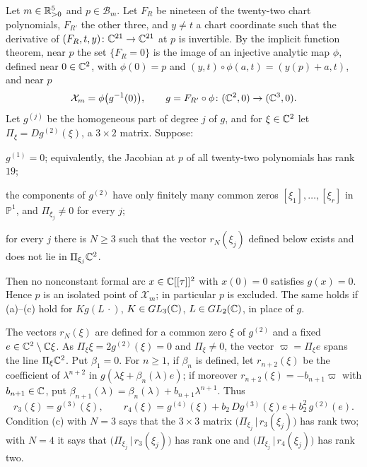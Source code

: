 \begin{lemma}\label{lem:d2-corank-two}
Let $m\in\mathbb{R}_{>0}^5$ and $p\in\mathcal B_m$.  Let $F_R$ be nineteen of the twenty-two chart polynomials,
$F_{R'}$ the other three, and $y\ne t$ a chart coordinate such that the derivative of
$(F_R,t,y)\colon\mathbb{C}^{21}\to\mathbb{C}^{21}$ at $p$ is invertible.  By the implicit function theorem,
near $p$ the set $\{F_R=0\}$ is the image of an injective analytic map $\phi$, defined near
$0\in\mathbb{C}^2$, with $\phi(0)=p$ and $(y,t)\circ\phi(a,t)=(y(p)+a,t)$, and near $p$
\[
  \mathcal X_m=\phi\bigl(g^{-1}(0)\bigr),\qquad g=F_{R'}\circ\phi\colon(\mathbb{C}^2,0)\to(\mathbb{C}^3,0).
\]
Let $g^{(j)}$ be the homogeneous part of degree $j$ of $g$, and for $\xi\in\mathbb{C}^2$ let
$\Pi_\xi=Dg^{(2)}(\xi)$, a $3\times2$ matrix.  Suppose:
\begin{alphalist}
  \item $g^{(1)}=0$; equivalently, the Jacobian at $p$ of all twenty-two polynomials has
  rank~$19$;
  \item the components of $g^{(2)}$ have only finitely many common zeros $[\xi_1],\dots,[\xi_r]$
  in $\mathbb P^1$, and $\Pi_{\xi_j}\ne0$ for every $j$;
  \item for every $j$ there is $N\ge3$ such that the vector $r_N(\xi_j)$ defined below exists
  and does not lie in $\Pi_{\xi_j}\mathbb{C}^2$.
\end{alphalist}
Then no nonconstant formal arc $x\in\mathbb{C}[[\tau]]^2$ with $x(0)=0$ satisfies $g(x)=0$.  Hence $p$
is an isolated point of $\mathcal X_m$; in particular $p$ is excluded.  The same holds if
\textup{(a)--(c)} hold for $Kg(L\,\cdot)$, $K\in GL_3(\mathbb{C})$, $L\in GL_2(\mathbb{C})$, in place
of $g$.

The vectors $r_N(\xi)$ are defined for a common zero $\xi$ of $g^{(2)}$ and a fixed
$e\in\mathbb{C}^2\setminus\mathbb{C}\xi$.  As $\Pi_\xi\xi=2g^{(2)}(\xi)=0$ and $\Pi_\xi\ne0$, the vector
$\varpi=\Pi_\xi e$ spans the line $\Pi_\xi\mathbb{C}^2$.  Put $\beta_1=0$.  For $n\ge1$, if $\beta_n$ is
defined, let $r_{n+2}(\xi)$ be the coefficient of $\lambda^{n+2}$ in
$g(\lambda\xi+\beta_n(\lambda)e)$; if moreover $r_{n+2}(\xi)=-b_{n+1}\varpi$ with $b_{n+1}\in\mathbb{C}$,
put $\beta_{n+1}(\lambda)=\beta_n(\lambda)+b_{n+1}\lambda^{n+1}$.  Thus
\[
  r_3(\xi)=g^{(3)}(\xi),\qquad
  r_4(\xi)=g^{(4)}(\xi)+b_2\,Dg^{(3)}(\xi)e+b_2^2\,g^{(2)}(e).
\]
Condition (c) with $N=3$ says that the $3\times3$ matrix $\bigl(\Pi_{\xi_j}\,|\,r_3(\xi_j)\bigr)$
has rank two; with $N=4$ it says that $\bigl(\Pi_{\xi_j}\,|\,r_3(\xi_j)\bigr)$ has rank one and
$\bigl(\Pi_{\xi_j}\,|\,r_4(\xi_j)\bigr)$ has rank two.
\end{lemma}

